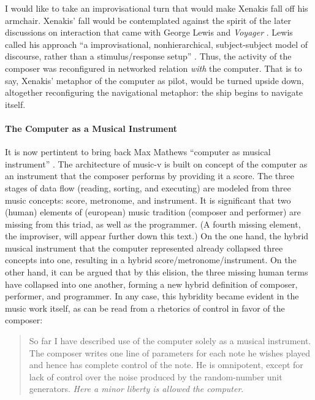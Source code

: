 I would like to take an improvisational turn that would make Xenakis fall off his armchair. Xenakis' fall would be contemplated against the spirit of the later discussions on interaction that came with George Lewis and \textit{Voyager} \parencite{Lew93:Put, Lew99:Int, Lew00:Too}. Lewis called his approach ``a improvisational, nonhierarchical, subject-subject model of discourse, rather than a stimulus/response setup'' \parencite[104]{Lew99:Int}. Thus, the activity of the composer was reconfigured in networked relation \textit{with} the computer. That is to say, Xenakis' metaphor of the computer as pilot, would be turned upside down, altogether reconfiguring the navigational metaphor: the ship begins to navigate itself.

\paragraph{The Computer as a Musical Instrument}
It is now pertintent to bring back Max Mathews ``computer as musical instrument'' \parencite{Mat63:The}. The architecture of \gls{music-v} is built on concept of the computer as an instrument that the composer performs by providing it a score. The three stages of data flow (reading, sorting, and executing) are modeled from three music concepts: score, metronome, and instrument. It is significant that two (human) elements of (european) music tradition (composer and performer) are missing from this triad, as well as the programmer. (A fourth missing element, the improviser, will appear further down this text.) On the one hand, the hybrid musical instrument that the computer represented already collapsed three concepts into one, resulting in a hybrid score/metronome/instrument. On the other hand, it can be argued that by this elision, the three missing human terms have collapsed into one another, forming a new hybrid definition of composer, performer, and programmer. In any case, this hybridity became evident in the music work itself, as can be read from a rhetorics of control in favor of the composer: 

\begin{quote}
	So far I have described use of the computer solely as a musical instrument. The composer writes one line of parameters for each note he wishes played and hence has complete control of the note. He is omnipotent, except for lack of control over the noise produced by the random-number unit generators. \textit{Here a minor liberty is allowed the computer}. \im \parencite[557]{Mat63:The}
\end{quote}

